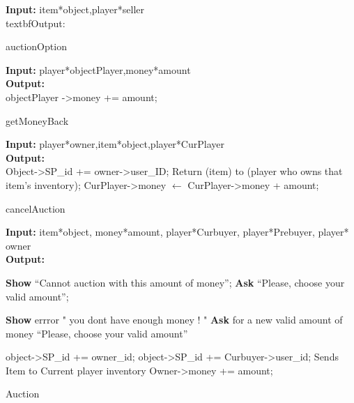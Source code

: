 \documentclass[a4paper]{article}
\begin{document}
\begin{algorithm}
 \textbf{Input:} item*object,player*seller\\
 textbf{Output:}\\
 
    \EndIf
    
 \caption{auctionOption}
\end{algorithm}
    
\begin{algorithm}
 \textbf{Input:} player*objectPlayer,money*amount\\
  \textbf{Output:}\\
    \State objectPlayer ->money += amount;
    
    \caption{getMoneyBack}
\end{algorithm}

\begin{algorithm}
\textbf{Input:}  player*owner,item*object,player*CurPlayer\\
\textbf{Output:}\\
    \State Object->SP\_id += owner->user\_ID;
	\State Return (item) to (player who owns that item’s inventory);
	\State CurPlayer->money $\gets$ CurPlayer->money + amount;
\caption{cancelAuction}
\end{algorithm}

\begin{algorithm}
\textbf{Input:} item*object, money*amount, player*Curbuyer, player*Prebuyer, player* owner\\
\textbf{Output:}\\
    {
        {
            \State \textbf{Show}  “Cannot auction with this amount of money”;
            \State \textbf{Ask} “Please, choose your valid amount”;
        }
        
        \Else
        {
            {
                \State \textbf{Show} errror " you dont have enough money ! "
				\State \textbf{Ask} for a new valid amount of money “Please, choose your valid amount”
            }
        }
    }
    \Else
    {
        {
            \State object->SP\_id += owner\_id;
        }
        \Else
        {
            \State object->SP\_id += Curbuyer->user\_id;
			\State Sends Item to Current player inventory	
			\State Owner->money += amount;
        }
    }
\caption{Auction}
\end{algorithm}
\end{document}
